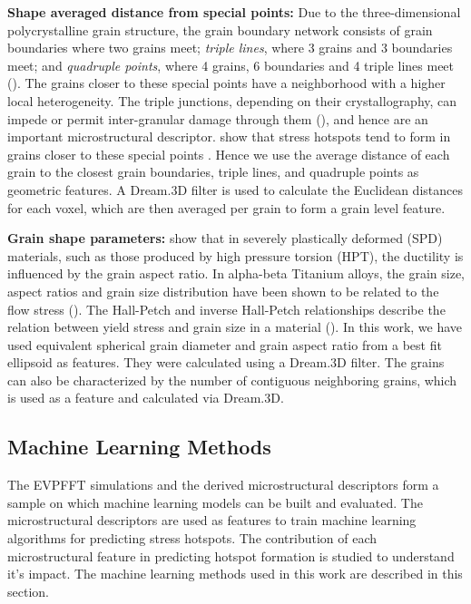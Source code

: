 \documentclass[preprint,1p,times,authoryear]{elsarticle}%
\begin{document}
\textbf{Shape averaged distance from special points: }Due to the three-dimensional polycrystalline grain structure, the grain boundary network consists of grain boundaries where two grains meet; \textit{triple lines}, where 3 grains and 3 boundaries meet; and \textit{quadruple points}, where 4 grains, 6 boundaries and 4 triple lines meet (\cite{Smith1948}). The grains closer to these special points have a neighborhood with a higher local heterogeneity. The triple junctions, depending on their crystallography, can impede or permit inter-granular damage through them (\cite{JohnsonSchuh2013}), and hence are an important microstructural descriptor.  \cite{Rollett2010a} show that stress hotspots tend to form in grains closer to these special points . Hence we use the average distance of each grain to the closest grain boundaries, triple lines, and quadruple points as geometric features. A Dream.3D filter is used to calculate the Euclidean distances for each voxel, which are then averaged per grain to form a grain level feature. 

\textbf{Grain shape parameters: }
\cite{Rathmayr2013} show that in severely plastically deformed (SPD) materials, such as those produced by high pressure torsion (HPT), the ductility is influenced by the grain aspect ratio. In alpha-beta Titanium alloys, the grain size, aspect ratios and grain size distribution have been shown to be related to the flow stress (\cite{Rhaipu2002}). The Hall-Petch and inverse Hall-Petch relationships describe the relation between yield stress and grain size in a material (\cite{counts2008predicting}). In this work, we have used equivalent spherical grain diameter and grain aspect ratio from a best fit ellipsoid as features. They were calculated using a Dream.3D filter. The grains can also be characterized by the number of contiguous neighboring grains, which is used as a feature and calculated via Dream.3D.

\subsection{Machine Learning Methods}
The EVPFFT simulations and the derived microstructural descriptors form a sample on which machine learning models can be built and evaluated. The microstructural descriptors are used as features to train machine learning algorithms for predicting stress hotspots. The contribution of each microstructural feature in predicting hotspot formation is studied to understand it's impact. The machine learning methods used in this work are described in this section.
\end{document}
